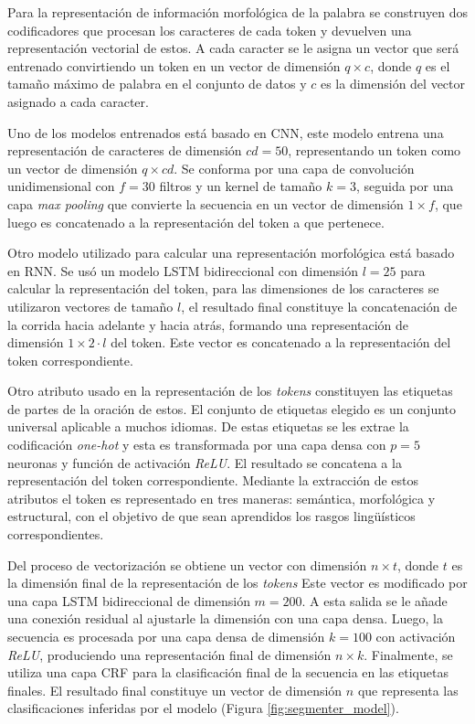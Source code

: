 \documentclass[a4paper,11pt,twocolumn,twoside]{article}
\begin{document}
Para la representación de información morfológica de la palabra se construyen dos
codificadores que procesan los caracteres de cada token y devuelven una representación vectorial de estos.
A cada caracter se le asigna un vector que será entrenado convirtiendo un token en un vector de dimensión
$q \times c$, donde $q$ es el tamaño máximo de palabra en el conjunto de datos y $c$ es la dimensión del vector
asignado a cada caracter.

Uno de los modelos entrenados está basado en CNN, este modelo entrena una representación de caracteres de dimensión
$cd=50$, representando un token como un vector de dimensión $q \times cd$. Se conforma por una capa de convolución unidimensional
con $f=30$ filtros y un kernel de tamaño $k=3$, seguida por una capa \textit{max pooling} que convierte la secuencia en un vector
de dimensión $1 \times f$, que luego es concatenado a la representación del token a que pertenece.

Otro modelo utilizado para calcular una representación morfológica está basado en RNN. Se usó
un modelo LSTM bidireccional con dimensión $l=25$ para calcular la representación del token, para las dimensiones de los caracteres se
utilizaron vectores de tamaño $l$, el resultado final constituye la concatenación de la corrida hacia adelante y
hacia atrás, formando una representación de dimensión $1 \times 2 \cdot l$ del token. Este vector es concatenado a la representación
del token correspondiente. 

Otro atributo usado en la representación de los \textit{tokens} constituyen las etiquetas de 
partes de la oración de estos.
El conjunto de etiquetas elegido es un conjunto universal \cite{petrov2011universal} aplicable a muchos idiomas.
De estas etiquetas se les extrae la codificación \textit{one-hot} y esta es transformada por una capa densa con $p=5$ neuronas
y función de activación \textit{ReLU}. El resultado se concatena a la representación del token correspondiente. Mediante 
la extracción de estos atributos el token es representado en tres maneras: semántica, morfológica y estructural, con el 
objetivo de que sean aprendidos los rasgos lingüísticos correspondientes.

Del proceso de vectorización se obtiene un vector con dimensión $n \times t$, donde $t$ es la dimensión final de la representación
de los \textit{tokens}  Este vector es modificado por una capa LSTM bidireccional de dimensión $m=200$. A esta salida se le 
añade una conexión residual al ajustarle la dimensión con una capa densa. Luego, la secuencia es procesada por una 
capa densa de dimensión $k=100$ con activación \textit{ReLU}, produciendo una representación final de dimensión 
$n \times k$. Finalmente, se utiliza una capa CRF
para la clasificación final de la secuencia en las etiquetas finales. El resultado final constituye un vector
de dimensión $n$ que representa las clasificaciones inferidas por el modelo (Figura \ref{fig:segmenter_model}).
\end{document}
